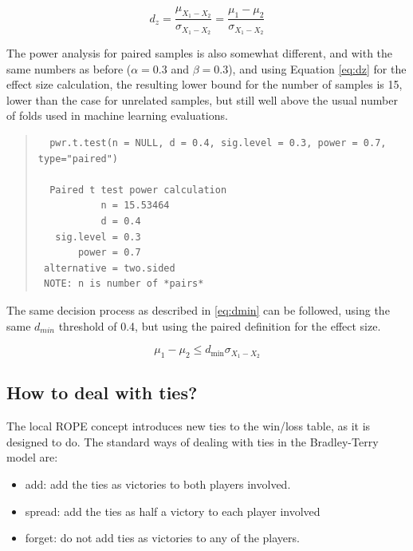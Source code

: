 \documentclass[twoside,11pt,preprint]{article}
\def\tightlist{}
\begin{document}
\begin{equation} \label{eq:dz}
d_z = \frac{\mu_{X_1 - X_2}}{\sigma_{X_1 - X_2}} = \frac{\mu_1 - \mu_2}{\sigma_{X_1 - X_2}} 
\end{equation}

The power analysis for paired samples is also somewhat different, and
with the same numbers as before (\(\alpha = 0.3\) and \(\beta = 0.3\)),
and using Equation \ref{eq:dz} for the effect size calculation, the
resulting lower bound for the number of samples is 15, lower than the
case for unrelated samples, but still well above the usual number of
folds used in machine learning evaluations.

\begin{quote}
\begin{verbatim}
  pwr.t.test(n = NULL, d = 0.4, sig.level = 0.3, power = 0.7, type="paired")

  Paired t test power calculation 
           n = 15.53464
           d = 0.4
   sig.level = 0.3
       power = 0.7
 alternative = two.sided
 NOTE: n is number of *pairs*
\end{verbatim}
\end{quote}

The same decision process as described in \ref{eq:dmin} can be
followed, using the same \(d_{min}\) threshold of 0.4, but using the
paired definition for the effect size.

\begin{equation} \label{eq:dmin2}
\mu_1 - \mu_2 \le d_{\min} \sigma_{X_1 - X_2}
\end{equation}

\hypertarget{how-to-deal-with-ties}{%
\subsection{\texorpdfstring{How to deal with ties? \label{test-ties}}{How to deal with ties? }}\label{how-to-deal-with-ties}}

The local ROPE concept introduces new ties to the win/loss table, as it is designed to do.
The standard ways of dealing with ties in the Bradley-Terry model are:

\begin{itemize}
\tightlist
\item
  add: add the ties as victories to both players involved.
\item
  spread: add the ties as half a victory to each player involved
\item
  forget: do not add ties as victories to any of the players.
\end{itemize}
\end{document}

